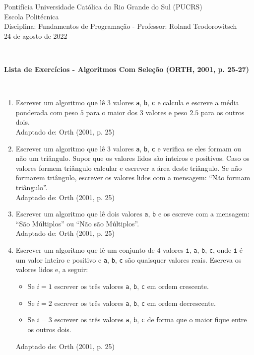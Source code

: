 \documentclass[onecolumn,a4paper,10pt]{report}
\newcommand{\+}{\, + \,}
\newcommand{\<}{\hspace*{-0.4cm}}
\begin{document}
\singlespacing

\begin{center}
Pontifícia Universidade Católica do Rio Grande do Sul (PUCRS)\\
Escola Politécnica\\
Disciplina: Fundamentos de Programação - Professor: Roland Teodorowitsch\\
24 de agosto de 2022
\end{center}
~\\

\begin{center}
\textbf{Lista de Exercícios - Algoritmos Com Seleção (ORTH, 2001, p. 25-27)}
\end{center}
~\\

\begin{enumerate}[1.]

\item Escrever um algoritmo que lê $3$ valores \texttt{a}, \texttt{b}, \texttt{c} e calcula e escreve a média ponderada com peso $5$ para o maior dos $3$ valores e peso $2.5$ para os outros dois.\\
{\tiny Adaptado de: Orth (2001, p. 25)}

\item Escrever um algoritmo que lê 3 valores \texttt{a}, \texttt{b}, \texttt{c} e verifica se eles formam ou não um triângulo. Supor que os valores lidos são inteiros e positivos. Caso os valores formem triângulo calcular e escrever a área deste triângulo. Se não formarem triângulo, escrever os valores lidos com a mensagem: ``Não formam triângulo''.\\
{\tiny Adaptado de: Orth (2001, p. 25)}

\item Escrever um algoritmo que lê dois valores \texttt{a}, \texttt{b} e os escreve com a mensagem: ``São Múltiplos'' ou ``Não são Múltiplos''.\\
{\tiny Adaptado de: Orth (2001, p. 25)}

\item Escrever um algoritmo que lê um conjunto de $4$ valores \texttt{i}, \texttt{a}, \texttt{b}, \texttt{c}, onde \texttt{i} é um valor inteiro e positivo e \texttt{a}, \texttt{b}, \texttt{c} são quaisquer valores reais. Escreva os valores lidos e, a seguir:
\begin{itemize}
    \item Se $i = 1$ escrever os três valores \texttt{a}, \texttt{b}, \texttt{c} em ordem crescente.
    \item Se $i = 2$ escrever os três valores \texttt{a}, \texttt{b}, \texttt{c} em ordem decrescente.
    \item Se $i = 3$ escrever os três valores \texttt{a}, \texttt{b}, \texttt{c} de forma que o maior fique entre os outros dois.
\end{itemize}
{\tiny Adaptado de: Orth (2001, p. 25)}


\end{enumerate}
\end{document}

